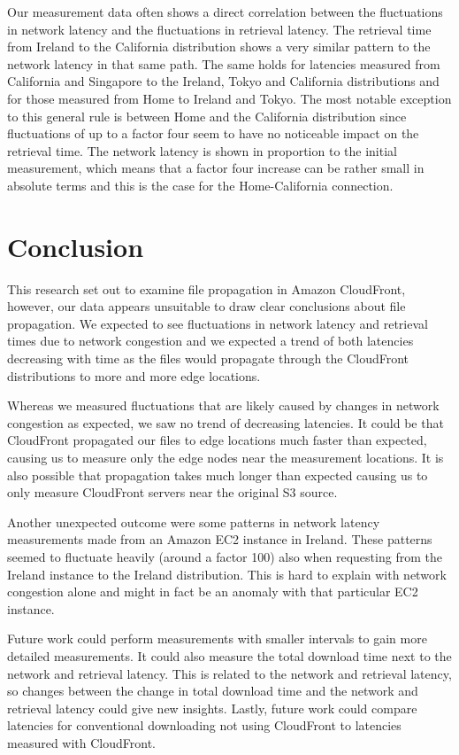 \documentclass[conference]{IEEEtran}
\begin{document}
Our measurement data often shows a direct correlation between the fluctuations in network latency and the fluctuations in retrieval latency. The retrieval time from Ireland to the California distribution shows a very similar pattern to the network latency in that same path. The same holds for latencies measured from California and Singapore to the Ireland, Tokyo and California distributions and for those measured from Home to Ireland and Tokyo. The most notable exception to this general rule is between Home and the California distribution since fluctuations of up to a factor four seem to have no noticeable impact on the retrieval time. The network latency is shown in proportion to the initial measurement, which means that a factor four increase can be rather small in absolute terms and this is the case for the Home-California connection.


\section{Conclusion}
This research set out to examine file propagation in Amazon CloudFront, however, our data appears unsuitable to draw clear conclusions about file propagation. We expected to see fluctuations in network latency and retrieval times due to network congestion and we expected a trend of both latencies decreasing with time as the files would propagate through the CloudFront distributions to more and more edge locations.

Whereas we measured fluctuations that are likely caused by changes in network congestion as expected, we saw no trend of decreasing latencies. It could be that CloudFront propagated our files to edge locations much faster than expected, causing us to measure only the edge nodes near the measurement locations. It is also possible that propagation takes much longer than expected causing us to only measure CloudFront servers near the original S3 source.

Another unexpected outcome were some patterns in network latency measurements made from an Amazon EC2 instance in Ireland. These patterns seemed to fluctuate heavily (around a factor 100) also when requesting from the Ireland instance to the Ireland distribution. This is hard to explain with network congestion alone and might in fact be an anomaly with that particular EC2 instance.

Future work could perform measurements with smaller intervals to gain more detailed measurements. It could also measure the total download time next to the network and retrieval latency. This is related to the network and retrieval latency, so changes between the change in total download time and the network and retrieval latency could give new insights. Lastly, future work could compare latencies for conventional downloading not using CloudFront to latencies measured with CloudFront.





\end{document}

